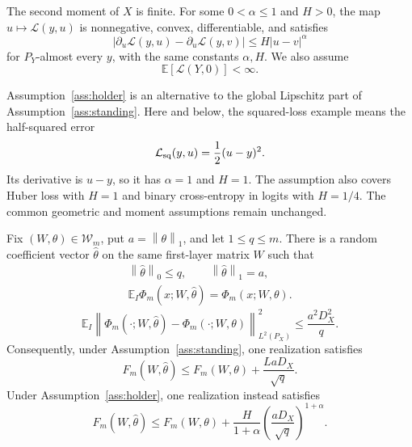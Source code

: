 \documentclass[smallextended,envcountsect]{svjour3}
\newcommand{\E}{\mathbb{E}}
\newcommand{\norm}[1]{\left\lVert #1 \right\rVert}
\newcommand{\abs}[1]{\left\lvert #1 \right\rvert}
\begin{document}
\begin{assumption}\label{ass:holder}
The second moment of $X$ is finite. For some $0<\alpha\le1$ and $H>0$, the map
$u\mapsto\mathcal L(y,u)$ is nonnegative, convex, differentiable, and satisfies
\begin{equation}
 \abs{\partial_u\mathcal L(y,u)-\partial_u\mathcal L(y,v)}
 \le H\abs{u-v}^{\alpha}
 \label{eq:holder-gradient}
\end{equation}
for $P_Y$-almost every $y$, with the same constants $\alpha,H$. We also assume
\[
 \E[\mathcal L(Y,0)]<\infty.
\]
\end{assumption}

Assumption~\ref{ass:holder} is an alternative to the global Lipschitz part of
Assumption~\ref{ass:standing}.  Here and below, the squared-loss example means
the half-squared error
\[
 \mathcal L_{\rm sq}(y,u)=\frac12(u-y)^2.
\]
Its derivative is $u-y$, so it has $\alpha=1$ and $H=1$.  The assumption also
covers Huber loss with $H=1$ and binary cross-entropy in logits with $H=1/4$.
The common geometric and moment assumptions remain unchanged.

\begin{lemma}\label{lem:self-sparsification}
Fix $(W,\theta)\in\mathcal W_m$, put $a=\norm{\theta}_1$, and let
$1\le q\le m$.  There is a random coefficient vector $\widehat\theta$ on the
same first-layer matrix $W$ such that
\begin{equation}
 \begin{gathered}
  \norm{\widehat\theta}_0\le q,
  \qquad \norm{\widehat\theta}_1=a,\\
  \E_I\Phi_m(x;W,\widehat\theta)=\Phi_m(x;W,\theta).
 \end{gathered}
 \label{eq:sampling-invariants}
\end{equation}
\begin{equation}
 \E_I\norm{\Phi_m(\cdot;W,\widehat\theta)
 -\Phi_m(\cdot;W,\theta)}_{L^2(P_X)}^2
 \le \frac{a^2D_X^2}{q}.
 \label{eq:sampling-variance}
\end{equation}
Consequently, under Assumption~\ref{ass:standing}, one realization satisfies
\begin{equation}
 F_m(W,\widehat\theta)
 \le F_m(W,\theta)+\frac{LaD_X}{\sqrt q}.
 \label{eq:lipschitz-sampling}
\end{equation}
Under Assumption~\ref{ass:holder}, one realization instead satisfies
\begin{equation}
 F_m(W,\widehat\theta)
 \le F_m(W,\theta)
 +\frac{H}{1+\alpha}
 \left(\frac{aD_X}{\sqrt q}\right)^{1+\alpha}.
 \label{eq:holder-sampling}
\end{equation}
\end{lemma}
\end{document}
